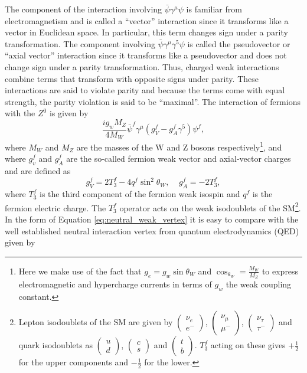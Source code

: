  The component of the interaction involving $\bar{\psi}\gamma^{\mu}\psi$ is familiar from electromagnetism and is called a ``vector'' interaction since it transforms like a vector in Euclidean space. In particular, this term changes sign under a parity transformation. The component involving $\bar{\psi}\gamma^{\mu}\gamma^5\psi$ is called the pseudovector or ``axial vector'' interaction since it transforms like a pseudovector and does not change sign under a parity transformation. Thus, charged weak interactions combine terms that transform with opposite signs under parity. These interactions are said to violate parity and because the terms come with equal strength, the parity violation is said to be ``maximal''.  The interaction of fermions with the $Z^0$ is given by
\begin{equation}
  \frac{ig_wM_Z}{4M_W}\bar{\psi}^f\gamma^{\mu}(g_V^f-g_A^f\gamma^5)\psi^f,
\label{eq:neutral_weak_vertex}
\end{equation} 
where $M_W$ and $M_Z$ are the masses of the W and Z bosons respectively\footnote{Here we make use of the fact that $g_e=g_w\sin\theta_W$ and $\cos_{\theta_W}=\frac{M_W}{M_Z}$ to express electromagnetic and hypercharge currents in terms of $g_w$ the weak coupling constant.}, and where $g_v^f$  and $g_A^f$ are the so-called fermion weak vector and axial-vector charges and are defined as 
\begin{equation}
g_V^f = 2T_3^f-4q^f\sin^2\theta_W, ~~~~~ g_A^f=-2T_3^f,
\label{eq:fermion_Qw}
\end{equation}
where $T_3^f$ is the third component of the fermion weak isospin and $q^f$ is the fermion electric charge\cite{Musolf1994}.  The $T_3^f$ operator acts on the weak isodoublets of the SM\footnote{Lepton isodoublets of the SM are given by $\left(\begin{array}{c}\nu_e\\e^-\end{array}\right)$, $\left(\begin{array}{c}\nu_{\mu}\\\mu^-\end{array}\right)$, $\left(\begin{array}{c}\nu_{\tau}\\\tau^-\end{array}\right)$ and quark isodoublets as $\left(\begin{array}{c}u\\d\end{array}\right)$, $\left(\begin{array}{c}c\\s\end{array}\right)$ and  $\left(\begin{array}{c}t\\b\end{array}\right)$. $T_3^f$ acting on these gives $+\frac{1}{2}$ for the upper components and $-\frac{1}{2}$ for the lower.}. In the form of Equation \ref{eq:neutral_weak_vertex} it is easy to compare with the well established neutral interaction vertex from quantum electrodynamics (QED) given by 
